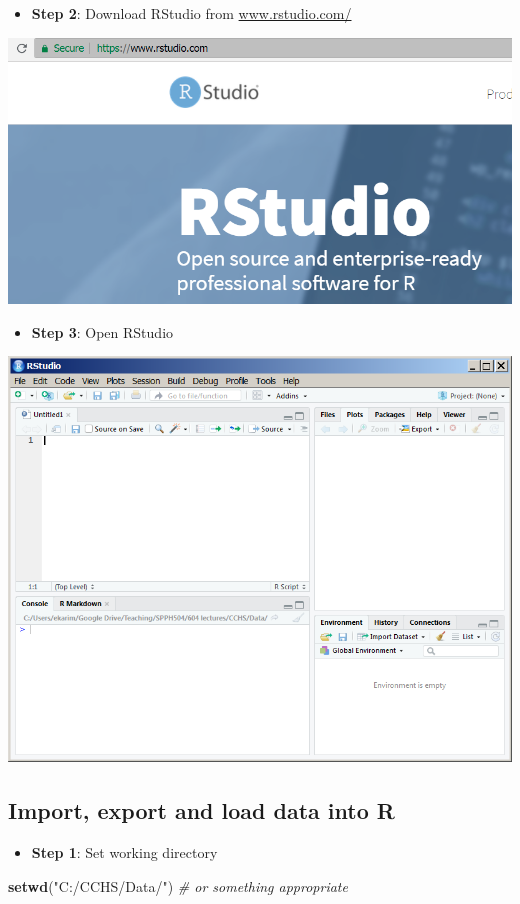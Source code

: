 \documentclass[
]{book}
\newenvironment{Shaded}{\begin{snugshade}}{\end{snugshade}}
\newcommand{\CommentTok}[1]{\textcolor[rgb]{0.56,0.35,0.01}{\textit{#1}}}
\newcommand{\KeywordTok}[1]{\textcolor[rgb]{0.13,0.29,0.53}{\textbf{#1}}}
\newcommand{\NormalTok}[1]{#1}
\newcommand{\StringTok}[1]{\textcolor[rgb]{0.31,0.60,0.02}{#1}}
\providecommand{\tightlist}{%
  \setlength{\itemsep}{0pt}\setlength{\parskip}{0pt}}
\begin{document}
\begin{itemize}
\tightlist
\item
  \textbf{Step 2}: Download RStudio from \href{https://www.rstudio.com/}{www.rstudio.com/}
\end{itemize}

\includegraphics[width=0.65\linewidth]{images/R02}

\begin{itemize}
\tightlist
\item
  \textbf{Step 3}: Open RStudio
\end{itemize}

\includegraphics[width=0.65\linewidth]{images/R04}

\hypertarget{import-export-and-load-data-into-r}{%
\subsection{Import, export and load data into R}\label{import-export-and-load-data-into-r}}

\begin{itemize}
\tightlist
\item
  \textbf{Step 1}: Set working directory
\end{itemize}

\begin{Shaded}
\begin{Highlighting}[]
\KeywordTok{setwd}\NormalTok{(}\StringTok{"C:/CCHS/Data/"}\NormalTok{) }\CommentTok{# or something appropriate}
\end{Highlighting}
\end{Shaded}
\end{document}
